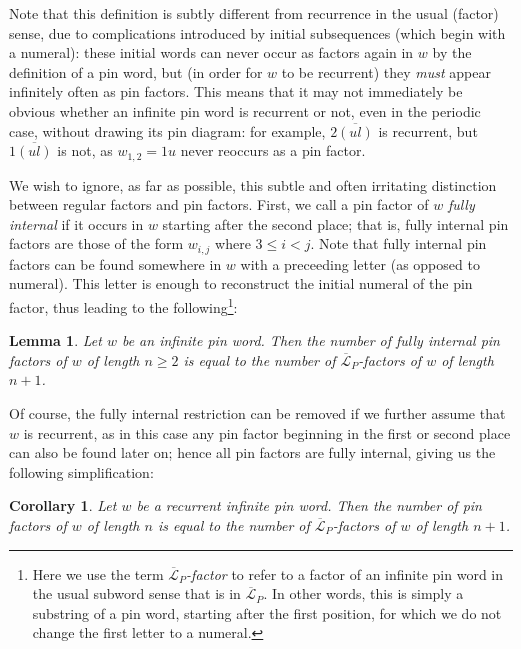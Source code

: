 \documentclass[11pt,a4paper]{article}
\newtheorem{cor}[thm]{Corollary}
\newtheorem{lemma}[thm]{Lemma}
\theoremstyle{definition}
\begin{document}
Note that this definition is subtly different from recurrence in the usual (factor) sense, due to complications introduced by initial subsequences (which begin with a numeral): these initial words can never occur as factors again in $w$ by the definition of a pin word, but (in order for $w$ to be recurrent) they \emph{must} appear infinitely often as pin factors. This means that it may not immediately be obvious whether an infinite pin word is recurrent or not, even in the periodic case, without drawing its pin diagram: for example, $2\overline{(ul)}$ is recurrent, but $1\overline{(ul)}$ is not, as $w_{1,2}=1u$ never reoccurs as a pin factor.

We wish to ignore, as far as possible, this subtle and often irritating distinction between regular factors and pin factors. First, we call a pin factor of $w$ \emph{fully internal} if it occurs in $w$ starting after the second place; that is, fully internal pin factors are those of the form $w_{i,j}$ where $3 \leq i < j$. Note that fully internal pin factors can be found somewhere in $w$ with a preceeding letter (as opposed to numeral). This letter is enough to reconstruct the initial numeral of the pin factor, thus leading to the following\footnote{Here we use the term \emph{$\overline{\mathcal{L}}_{P}$-factor} to refer to a factor of an infinite pin word in the usual subword sense that is in $\overline{\mathcal{L}}_{P}$. In other words, this is simply a substring of a pin word, starting after the first position, for which we do not change the first letter to a numeral.}:

\begin{lemma} \label{pfsubwcorr}
Let $w$ be an infinite pin word. Then the number of fully internal pin factors of $w$ of length $n \geq 2$ is equal to the number of $\overline{\mathcal{L}}_{P}$-factors of $w$ of length $n+1$.
\end{lemma}

Of course, the fully internal restriction can be removed if we further assume that $w$ is recurrent, as in this case any pin factor beginning in the first or second place can also be found later on; hence all pin factors are fully internal, giving us the following simplification:

\begin{cor}\label{recpfsubwcorr}
Let $w$ be a recurrent infinite pin word.
Then the number of pin factors of $w$ of length $n$ is equal to the number of $\overline{\mathcal{L}}_{P}$-factors of $w$ of length $n+1$.
\end{cor}
\end{document}
